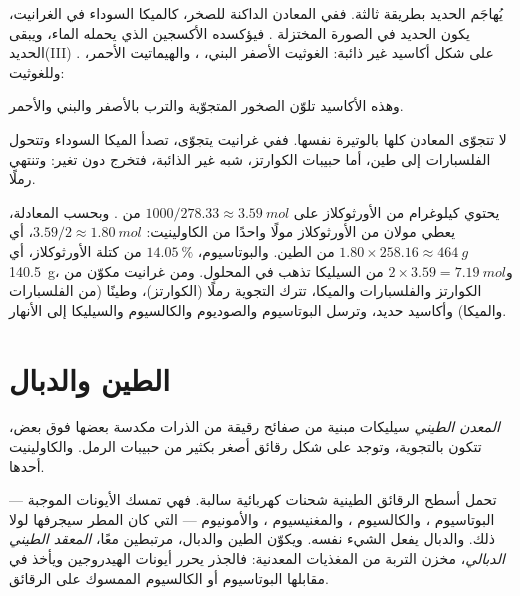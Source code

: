 يُهاجَم الحديد بطريقة ثالثة. ففي المعادن الداكنة للصخر، كالميكا السوداء في
الغرانيت، يكون الحديد في الصورة المختزلة . فيؤكسده الأكسجين الذي يحمله
الماء، ويبقى الحديد(III) على شكل أكاسيد غير ذائبة: الغوثيت الأصفر البني، ،
والهيماتيت الأحمر،
. وللغوثيت:
\begin{center}
\end{center}
وهذه الأكاسيد تلوّن الصخور المتجوّية والترب بالأصفر والبني والأحمر.

لا تتجوّى المعادن كلها بالوتيرة نفسها. ففي غرانيت يتجوّى، تصدأ الميكا السوداء
وتتحول الفلسبارات إلى طين، أما حبيبات الكوارتز، شبه غير الذائبة، فتخرج دون تغير:
وتنتهي رملًا.

\begin{example}\label{ex:g10:soil-formation:granite}
يحتوي كيلوغرام من الأورثوكلاز على $1000/278.33 \approx \qty{3.59}{mol}$ من
. وبحسب المعادلة، يعطي مولان من الأورثوكلاز مولًا واحدًا من
الكاولينيت: $3.59/2 \approx \qty{1.80}{mol}$، أي $1.80 \times 258.16
\approx \qty{464}{g}$ من الطين. والبوتاسيوم، $14.05~\%$ من كتلة
الأورثوكلاز، أي \qty{140.5}{g}، و$2 \times 3.59 = \qty{7.19}{mol}$ من السيليكا
تذهب في المحلول. ومن غرانيت مكوّن من الكوارتز والفلسبارات والميكا، تترك التجوية
رملًا (الكوارتز)، وطينًا (من الفلسبارات والميكا) وأكاسيد حديد، وترسل البوتاسيوم
والصوديوم والكالسيوم والسيليكا إلى الأنهار.
\end{example}

\section{الطين والدبال}

\begin{definition}\label{def:g10:soil-formation:clay}
\emph{المعدن الطيني} سيليكات مبنية من صفائح رقيقة من الذرات
مكدسة بعضها فوق بعض، تتكون بالتجوية، وتوجد على شكل رقائق أصغر بكثير من حبيبات
الرمل. والكاولينيت أحدها.
\end{definition}

تحمل أسطح الرقائق الطينية شحنات كهربائية سالبة. فهي تمسك الأيونات الموجبة ---
البوتاسيوم ، والكالسيوم ، والمغنيسيوم
، والأمونيوم  --- التي كان المطر سيجرفها لولا ذلك. والدبال يفعل
الشيء نفسه. ويكوّن الطين والدبال، مرتبطين معًا،
\emph{المعقد الطيني الدبالي}، مخزن التربة من المغذيات المعدنية: فالجذر يحرر أيونات
الهيدروجين ويأخذ في مقابلها البوتاسيوم أو الكالسيوم الممسوك على
الرقائق.

